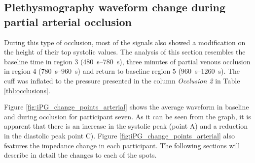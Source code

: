 \subsection{Plethysmography waveform change during partial arterial occlusion}
\label{section5.3.2}
During this type of occlusion, most of the signals also showed a modification on the height of their top systolic values. The analysis of this section resembles the baseline time in region 3 (\SIrange{480}{780}{\second}), three minutes of partial venous occlusion in region 4 (\SIrange{780}{960}{\second}) and return to baseline region 5 (\SIrange{960}{1260}{\second}). The cuff was inflated to the pressure presented in the column \textit{Occlusion 2} in Table \ref{tbl:occlusions}. 

Figure \ref{fig:iPG_change_points_arterial} shows the average waveform in baseline and during occlusion for participant seven. As it can be seen from the graph, it is apparent that there is an increase in the systolic peak (point A) and a reduction in the diastolic peak point C). Figure \ref{fig:iPG_change_points_arterial} also features the impedance change in each participant. The following sections will describe in detail the changes to each of the spots. 

